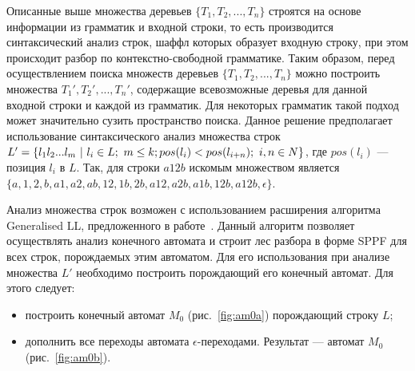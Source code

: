 \documentclass[14pt]{matmex-diploma-custom}
\begin{document}
    Описанные выше множества деревьев $\{T_1, T_2, ..., T_n\}$ строятся на основе информации из грамматик
    и входной строки, то есть производится синтаксический анализ строк,
    шаффл которых образует входную строку, при этом происходит разбор по контекстно-свободной грамматике.
    Таким образом, перед осуществлением поиска множеств деревьев  $\{T_1, T_2, ..., T_n\}$ можно построить 
    множества $T_1', T_2', ..., T_n'$, содержащие всевозможные деревья для данной входной строки и каждой из грамматик.
    Для некоторых грамматик такой подход может значительно сузить пространство поиска. 
    Данное решение предполагает использование синтаксического анализ множества строк
    $L' = \{l_1 l_2...l_m\ |\ l_i \in L;\ m \leq k;\newline pos(l_i)<pos(l_{i+n});\ i,n\in N\}$, где $pos(l_i)$ --- позиция $l_i$ в $L$.
    Так, для строки $a12b$ искомым множеством является $\{a, 1, 2, b, a1, a2, ab, 12, 1b, 2b, a12, a2b, a1b, 12b, a12b, \epsilon\}$.
    
    Анализ множества строк возможен с использованием расширения алгоритма Generalised LL, предложенного в работе~\cite{ragozina}.
    Данный алгоритм позволяет осуществлять анализ конечного автомата и строит лес разбора в форме SPPF для всех строк,
    порождаемых этим автоматом.
    Для его использования при анализе множества $L'$ необходимо построить порождающий его конечный автомат. 
    Для этого следует:
    \begin{itemize}
    	\item построить конечный автомат $M_0$ (рис.~\ref{fig:am0a}) порождающий строку $L$;
    	\item дополнить все переходы автомата $\epsilon$-переходами. Результат --- автомат $M_0$ (рис.~\ref{fig:am0b}).
    \end{itemize}
	
\end{document}
